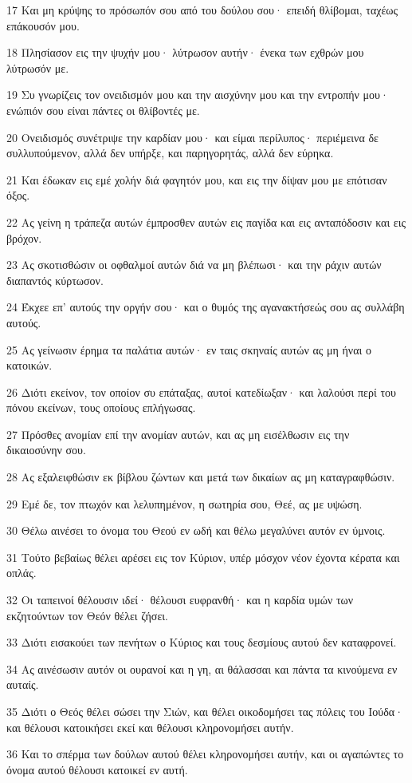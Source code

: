 \par 17 Και μη κρύψης το πρόσωπόν σου από του δούλου σου· επειδή θλίβομαι, ταχέως επάκουσόν μου.
\par 18 Πλησίασον εις την ψυχήν μου· λύτρωσον αυτήν· ένεκα των εχθρών μου λύτρωσόν με.
\par 19 Συ γνωρίζεις τον ονειδισμόν μου και την αισχύνην μου και την εντροπήν μου· ενώπιόν σου είναι πάντες οι θλίβοντές με.
\par 20 Ονειδισμός συνέτριψε την καρδίαν μου· και είμαι περίλυπος· περιέμεινα δε συλλυπούμενον, αλλά δεν υπήρξε, και παρηγορητάς, αλλά δεν εύρηκα.
\par 21 Και έδωκαν εις εμέ χολήν διά φαγητόν μου, και εις την δίψαν μου με επότισαν όξος.
\par 22 Ας γείνη η τράπεζα αυτών έμπροσθεν αυτών εις παγίδα και εις ανταπόδοσιν και εις βρόχον.
\par 23 Ας σκοτισθώσιν οι οφθαλμοί αυτών διά να μη βλέπωσι· και την ράχιν αυτών διαπαντός κύρτωσον.
\par 24 Έκχεε επ' αυτούς την οργήν σου· και ο θυμός της αγανακτήσεώς σου ας συλλάβη αυτούς.
\par 25 Ας γείνωσιν έρημα τα παλάτια αυτών· εν ταις σκηναίς αυτών ας μη ήναι ο κατοικών.
\par 26 Διότι εκείνον, τον οποίον συ επάταξας, αυτοί κατεδίωξαν· και λαλούσι περί του πόνου εκείνων, τους οποίους επλήγωσας.
\par 27 Πρόσθες ανομίαν επί την ανομίαν αυτών, και ας μη εισέλθωσιν εις την δικαιοσύνην σου.
\par 28 Ας εξαλειφθώσιν εκ βίβλου ζώντων και μετά των δικαίων ας μη καταγραφθώσιν.
\par 29 Εμέ δε, τον πτωχόν και λελυπημένον, η σωτηρία σου, Θεέ, ας με υψώση.
\par 30 Θέλω αινέσει το όνομα του Θεού εν ωδή και θέλω μεγαλύνει αυτόν εν ύμνοις.
\par 31 Τούτο βεβαίως θέλει αρέσει εις τον Κύριον, υπέρ μόσχον νέον έχοντα κέρατα και οπλάς.
\par 32 Οι ταπεινοί θέλουσιν ιδεί· θέλουσι ευφρανθή· και η καρδία υμών των εκζητούντων τον Θεόν θέλει ζήσει.
\par 33 Διότι εισακούει των πενήτων ο Κύριος και τους δεσμίους αυτού δεν καταφρονεί.
\par 34 Ας αινέσωσιν αυτόν οι ουρανοί και η γη, αι θάλασσαι και πάντα τα κινούμενα εν αυταίς.
\par 35 Διότι ο Θεός θέλει σώσει την Σιών, και θέλει οικοδομήσει τας πόλεις του Ιούδα· και θέλουσι κατοικήσει εκεί και θέλουσι κληρονομήσει αυτήν.
\par 36 Και το σπέρμα των δούλων αυτού θέλει κληρονομήσει αυτήν, και οι αγαπώντες το όνομα αυτού θέλουσι κατοικεί εν αυτή.

